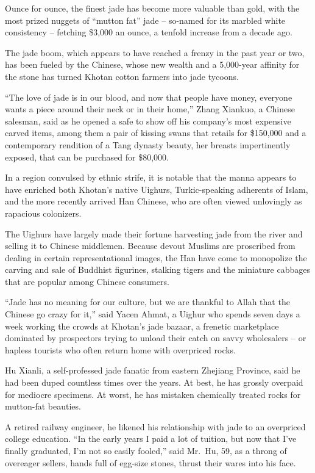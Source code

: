 ﻿\documentclass[12pt]{article}
\begin{document}
Ounce for ounce, the finest jade has become more valuable than gold, with the most prized nuggets of
``mutton fat'' jade -- so-named for its marbled white consistency -- fetching \$3,000 an ounce, a
tenfold increase from a decade ago.

The jade boom, which appears to have reached a frenzy in the past year or two, has been fueled by
the Chinese, whose new wealth and a 5,000-year affinity for the stone has turned Khotan cotton
farmers into jade tycoons.

``The love of jade is in our blood, and now that people have money, everyone wants a piece around
their neck or in their home,'' Zhang Xiankuo, a Chinese salesman, said as he opened a safe to show
off his company's most expensive carved items, among them a pair of kissing swans that retails for
\$150,000 and a contemporary rendition of a Tang dynasty beauty, her breasts impertinently exposed,
that can be purchased for \$80,000.

In a region convulsed by ethnic strife, it is notable that the manna appears to have enriched both
Khotan's native Uighurs, Turkic-speaking adherents of Islam, and the more recently arrived Han
Chinese, who are often viewed unlovingly as rapacious colonizers.

The Uighurs have largely made their fortune harvesting jade from the river and selling it to Chinese
middlemen. Because devout Muslims are proscribed from dealing in certain representational images,
the Han have come to monopolize the carving and sale of Buddhist figurines, stalking tigers and the
miniature cabbages that are popular among Chinese consumers.

``Jade has no meaning for our culture, but we are thankful to Allah that the Chinese go crazy for
it,'' said Yacen Ahmat, a Uighur who spends seven days a week working the crowds at Khotan's jade
bazaar, a frenetic marketplace dominated by prospectors trying to unload their catch on savvy
wholesalers -- or hapless tourists who often return home with overpriced rocks.

Hu Xianli, a self-professed jade fanatic from eastern Zhejiang Province, said he had been duped
countless times over the years. At best, he has grossly overpaid for mediocre specimens. At worst,
he has mistaken chemically treated rocks for mutton-fat beauties.

A retired railway engineer, he likened his relationship with jade to an overpriced college
education. ``In the early years I paid a lot of tuition, but now that I've finally graduated, I'm
not so easily fooled,'' said Mr.~Hu, 59, as a throng of overeager sellers, hands full of egg-size
stones, thrust their wares into his face.
\end{document}
